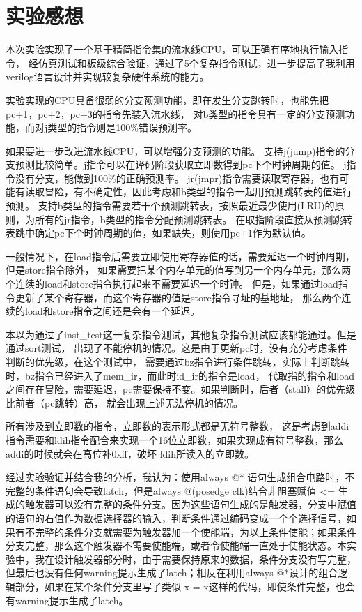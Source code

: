 \documentclass[10pt,a4paper,fleqn]{article}
\begin{document}
 \section{实验感想}
   \setlength{\parskip}{0.5\baselineskip}
   \par 本次实验实现了一个基于精简指令集的流水线CPU，可以正确有序地执行输入指令，
   经仿真测试和板级综合验证，通过了5个复杂指令测试，进一步提高了我利用verilog语言设计并实现较复杂硬件系统的能力。
   \par 实验实现的CPU具备很弱的分支预测功能，即在发生分支跳转时，也能先把pc+1，pc+2，pc+3的指令先装入流水线，
   对b类型的指令具有一定的分支预测功能，而对j类型的指令则是100\%错误预测率。
   \par 如果要进一步改进流水线CPU，可以增强分支预测的功能。
   支持j(jump)指令的分支预测比较简单。j指令可以在译码阶段获取立即数得到pc下个时钟周期的值。
   j指令没有分支，能做到100\%的正确预测率。
   jr(jmpr)指令需要读取寄存器，也有可能有读取冒险，有不确定性，因此考虑和b类型的指令一起用预测跳转表的值进行预测。
   支持b类型的指令需要若干个预测跳转表，按照最近最少使用(LRU)的原则，为所有的jr指令，b类型的指令分配预测跳转表。
   在取指阶段直接从预测跳转表跳中确定pc下个时钟周期的值，如果缺失，则使用pc+1作为默认值。
   \par 一般情况下，在load指令后需要立即使用寄存器值的话，需要延迟一个时钟周期，但是store指令除外，
   如果需要把某个内存单元的值写到另一个内存单元，那么两个连续的load和store指令执行起来不需要延迟一个时钟。
   但是，如果通过load指令更新了某个寄存器，而这个寄存器的值是store指令寻址的基地址，
   那么两个连续的load和store指令之间还是会有一个延迟。
   \par 本以为通过了inst\_test这一复杂指令测试，其他复杂指令测试应该都能通过。但是通过sort测试，
   出现了不能停机的情况。这是由于更新pc时，没有充分考虑条件判断的优先级，在这个测试中，
   需要通过bz指令进行条件跳转，实际上判断跳转时，bz指令已经进入了mem\_ir，而此时id\_ir的指令是load，
   代取指的指令和load之间存在冒险，需要延迟，pc需要保持不变。如果判断时，后者（stall）的优先级比前者（pc跳转）高，
   就会出现上述无法停机的情况。
   \par 所有涉及到立即数的指令，立即数的表示形式都是无符号整数，
   这是考虑到addi指令需要和ldih指令配合来实现一个16位立即数，如果实现成有符号整数，那么addi的时候就会在高位补0xff，破坏
   ldih所读入的立即数。
   \par 经过实验验证并结合我的分析，我认为：使用always @* 语句生成组合电路时，不完整的条件语句会导致latch，但是always @(posedge clk)结合非阻塞赋值 <= 生成的触发器可以没有完整的条件分支。因为这些语句生成的是触发器，分支中赋值的语句的右值作为数据选择器的输入，判断条件通过编码变成一个个选择信号，如果有不完整的条件分支就需要为触发器加一个使能端，为以上条件使能；如果条件分支完整，那么这个触发器不需要使能端，或者令使能端一直处于使能状态。本实验中，我在设计触发器部分时，由于需要保持原来的数据，条件分支没有写完整，但最后也没有任何warning提示生成了latch；相反在利用always @*设计的组合逻辑部分，如果在某个条件分支里写了类似 x = x这样的代码，即使条件完整，也会有warning提示生成了latch。
\end{document}
